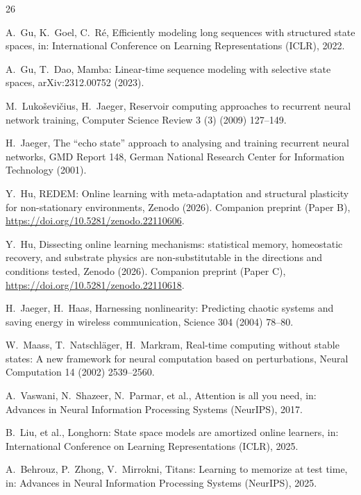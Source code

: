 \documentclass[preprint,12pt]{elsarticle}
\begin{document}
\begingroup{}
\begin{thebibliography}{26}

A.~Gu, K.~Goel, C.~R\'e, Efficiently modeling long sequences with
structured state spaces, in: International Conference on Learning
Representations (ICLR), 2022.

A.~Gu, T.~Dao, Mamba: Linear-time sequence modeling with selective state
spaces, arXiv:2312.00752 (2023).

M.~Luko\v{s}evi\v{c}ius, H.~Jaeger, Reservoir computing approaches to
recurrent neural network training, Computer Science Review 3 (3) (2009)
127--149.

H.~Jaeger, The ``echo state'' approach to analysing and training
recurrent neural networks, GMD Report 148, German National Research
Center for Information Technology (2001).

Y.~Hu, REDEM: Online learning with meta-adaptation and structural
plasticity for non-stationary environments, Zenodo (2026). Companion
preprint (Paper B), \url{https://doi.org/10.5281/zenodo.22110606}.

Y.~Hu, Dissecting online learning mechanisms: statistical memory,
homeostatic recovery, and substrate physics are non-substitutable in
the directions and conditions tested, Zenodo (2026). Companion preprint
(Paper C), \url{https://doi.org/10.5281/zenodo.22110618}.

H.~Jaeger, H.~Haas, Harnessing nonlinearity: Predicting chaotic systems
and saving energy in wireless communication, Science 304 (2004) 78--80.

W.~Maass, T.~Natschl\"ager, H.~Markram, Real-time computing without
stable states: A new framework for neural computation based on
perturbations, Neural Computation 14 (2002) 2539--2560.

A.~Vaswani, N.~Shazeer, N.~Parmar, et al., Attention is all you need, in:
Advances in Neural Information Processing Systems (NeurIPS), 2017.

B.~Liu, et al., Longhorn: State space models are amortized online
learners, in: International Conference on Learning Representations
(ICLR), 2025.

A.~Behrouz, P.~Zhong, V.~Mirrokni, Titans: Learning to memorize at test
time, in: Advances in Neural Information Processing Systems (NeurIPS),
2025.


\end{thebibliography}
\end{document}
